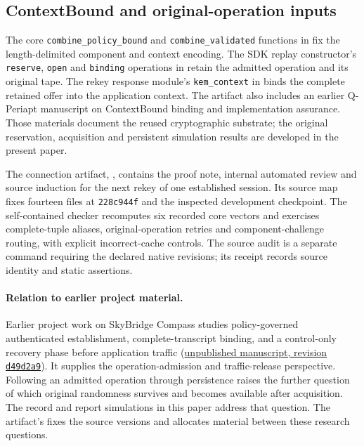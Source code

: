 \documentclass[pdflatex]{sn-jnl}
\theoremstyle{thmstyleone}
\theoremstyle{thmstylethree}
\theoremstyle{thmstyletwo}
\newcommand{\sourcecommit}{\texttt{228c944f}}
\begin{document}
\subsection{ContextBound and original-operation inputs}
\label{app:contextbound-source}

The core \texttt{combine\_policy\_bound} and \texttt{combine\_validated}
functions in
\href{https://github.com/billlza/q-periapt/blob/228c944fc476e3e57d6c08063cacb19bca5b360e/crates/q-periapt-core/src/lib.rs}{}
fix the length-delimited component and context encoding. The SDK replay
constructor's \texttt{reserve}, \texttt{open} and \texttt{binding} operations in
\href{https://github.com/billlza/q-periapt/blob/228c944fc476e3e57d6c08063cacb19bca5b360e/crates/q-periapt-sdk/src/expert/replay.rs}{}
retain the admitted operation and its original tape. The rekey response
module's \texttt{kem\_context} in
\href{https://github.com/billlza/q-periapt/blob/228c944fc476e3e57d6c08063cacb19bca5b360e/research/continuity-identity-candidate/src/durable/messages/rekey/response.rs}{}
binds the complete retained offer into the application context.
The artifact also includes an earlier Q-Periapt manuscript on ContextBound
binding and implementation assurance. Those materials document the reused
cryptographic substrate; the original reservation, acquisition and persistent
simulation results are developed in the present paper.

The connection artifact, ,
contains the proof note, internal automated review and source induction for the
next rekey of one established session. Its source map fixes fourteen files
at \sourcecommit{} and the inspected development checkpoint. The
self-contained checker recomputes six recorded core vectors and exercises
complete-tuple aliases, original-operation retries and component-challenge
routing, with explicit incorrect-cache controls. The source audit is a
separate command requiring the declared native revisions; its receipt records
source identity and static assertions.

\paragraph{Relation to earlier project material.}
Earlier project work on SkyBridge Compass studies policy-governed
authenticated establishment, complete-transcript binding, and a control-only
recovery phase before application traffic
(\href{https://github.com/billlza/Skybridge-Compass/blob/d49d2a9ed4e1fb00905adeb06c02989562e375af/Docs/TDSC-2026-01-0318_IEEE_Paper_SkyBridge_Compass_patched.tex}{unpublished manuscript, revision \texttt{d49d2a9}}).
It supplies the operation-admission and traffic-release perspective.
Following an admitted operation through persistence raises the further
question of which original randomness survives and becomes available
after acquisition. The record and report simulations in this paper
address that question. The artifact's
 fixes the source versions and allocates material
between these research questions.
\end{document}
